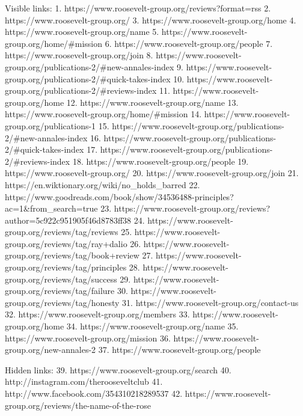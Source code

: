    Visible links:
   1. https://www.roosevelt-group.org/reviews?format=rss
   2. https://www.roosevelt-group.org/
   3. https://www.roosevelt-group.org/home
   4. https://www.roosevelt-group.org/name
   5. https://www.roosevelt-group.org/home/#mission
   6. https://www.roosevelt-group.org/people
   7. https://www.roosevelt-group.org/join
   8. https://www.roosevelt-group.org/publications-2/#new-annales-index
   9. https://www.roosevelt-group.org/publications-2/#quick-takes-index
  10. https://www.roosevelt-group.org/publications-2/#reviews-index
  11. https://www.roosevelt-group.org/home
  12. https://www.roosevelt-group.org/name
  13. https://www.roosevelt-group.org/home/#mission
  14. https://www.roosevelt-group.org/publications-1
  15. https://www.roosevelt-group.org/publications-2/#new-annales-index
  16. https://www.roosevelt-group.org/publications-2/#quick-takes-index
  17. https://www.roosevelt-group.org/publications-2/#reviews-index
  18. https://www.roosevelt-group.org/people
  19. https://www.roosevelt-group.org/
  20. https://www.roosevelt-group.org/join
  21. https://en.wiktionary.org/wiki/no_holds_barred
  22. https://www.goodreads.com/book/show/34536488-principles?ac=1&from_search=true
  23. https://www.roosevelt-group.org/reviews?author=5c922c951905f46d8783ff38
  24. https://www.roosevelt-group.org/reviews/tag/reviews
  25. https://www.roosevelt-group.org/reviews/tag/ray+dalio
  26. https://www.roosevelt-group.org/reviews/tag/book+review
  27. https://www.roosevelt-group.org/reviews/tag/principles
  28. https://www.roosevelt-group.org/reviews/tag/success
  29. https://www.roosevelt-group.org/reviews/tag/failure
  30. https://www.roosevelt-group.org/reviews/tag/honesty
  31. https://www.roosevelt-group.org/contact-us
  32. https://www.roosevelt-group.org/members
  33. https://www.roosevelt-group.org/home
  34. https://www.roosevelt-group.org/name
  35. https://www.roosevelt-group.org/mission
  36. https://www.roosevelt-group.org/new-annales-2
  37. https://www.roosevelt-group.org/people

   Hidden links:
  39. https://www.roosevelt-group.org/search
  40. http://instagram.com/therooseveltclub
  41. http://www.facebook.com/354310218289537
  42. https://www.roosevelt-group.org/reviews/the-name-of-the-rose
